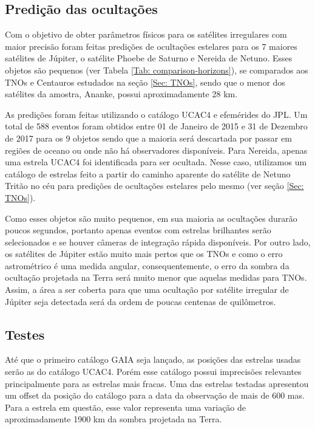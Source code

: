 \documentclass[12pt,a4paper]{monografia}
\begin{document}
\subsection{Prediç\~ao das ocultaç\~oes}
\label{Subsec: Irr-predic}

\indent \indent Com o objetivo de obter parâmetros físicos para os satélites irregulares com maior precisão foram feitas predições de ocultações estelares para os 7 maiores satélites de Júpiter, o satélite Phoebe de Saturno e Nereida de Netuno. Esses objetos são pequenos (ver Tabela \ref{Tab: comparison-horizons}), se comparados aos TNOs e Centauros estudados na seção \ref{Sec: TNOs}, sendo que o menor dos satélites da amostra, Ananke, possui aproximadamente 28 km.

As predições foram feitas utilizando o catálogo UCAC4 e efemérides do JPL. Um total de 588 eventos foram obtidos entre 01 de Janeiro de 2015 e 31 de Dezembro de 2017 para os 9 objetos sendo que a maioria será descartada por passar em regiões de oceano ou onde não há observadores disponíveis. Para Nereida, apenas uma estrela UCAC4 foi identificada para ser ocultada. Nesse caso, utilizamos um catálogo de estrelas feito a partir do caminho aparente do satélite de Netuno Tritão no céu para predições de ocultações estelares pelo mesmo (ver seção \ref{Sec: TNOs}).

Como esses objetos são muito pequenos, em sua maioria as ocultações durarão poucos segundos, portanto apenas eventos com estrelas brilhantes serão selecionados e se houver câmeras de integração rápida disponíveis. Por outro lado, os satélites de Júpiter estão muito mais pertos que os TNOs e como o erro astrométrico é uma medida angular, consequentemente, o erro da sombra da ocultação projetada na Terra será muito menor que aquelas medidas para TNOs. Assim, a área a ser coberta para que uma ocultação por satélite irregular de Júpiter seja detectada será da ordem de poucas centenas de quilômetros.

\subsection{Testes}
\label{Subsec: Irr-testes}

\indent \indent Até que o primeiro catálogo GAIA seja lançado, as posições das estrelas usadas serão as do catálogo UCAC4. Porém esse catálogo possui imprecisões relevantes principalmente para as estrelas mais fracas. Uma das estrelas testadas apresentou um offset da posição do catálogo para a data da observação de mais de 600 mas. Para a estrela em questão, esse valor representa uma variação de aproximadamente 1900 km da sombra projetada na Terra.
\end{document}
